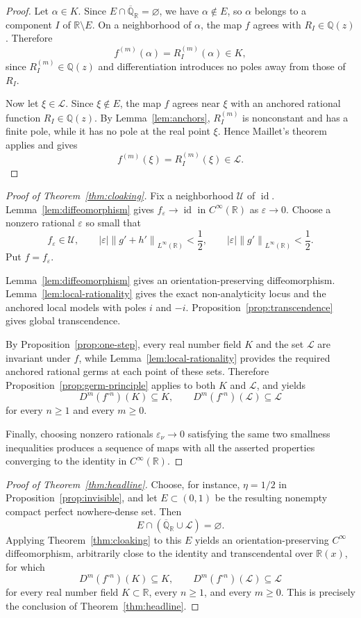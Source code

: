 \documentclass[11pt,reqno]{amsart}
\numberwithin{equation}{section}
\theoremstyle{definition}
\theoremstyle{remark}
\newcommand{\R}{\mathbb R}
\newcommand{\Q}{\mathbb Q}
\newcommand{\Ralg}{\overline{\mathbb Q}_{\mathbb R}}
\newcommand{\Lio}{\mathscr L}
\newcommand{\id}{\operatorname{id}}
\newcommand{\norm}[1]{\left\lVert #1\right\rVert}
\begin{document}
\begin{proof}
Let $\alpha\in K$. Since $E\cap\Ralg=\varnothing$, we have $\alpha\notin E$, so
$\alpha$ belongs to a component $I$ of $\R\setminus E$. On a neighborhood of
$\alpha$, the map $f$ agrees with $R_I\in\Q(z)$. Therefore
\[
f^{(m)}(\alpha)=R_I^{(m)}(\alpha)\in K,
\]
since $R_I^{(m)}\in\Q(z)$ and differentiation introduces no poles away
from those of $R_I$.

Now let $\xi\in\Lio$. Since $\xi\notin E$, the map $f$ agrees near $\xi$ with
an anchored rational function $R_I\in\Q(z)$. By Lemma~\ref{lem:anchors},
$R_I^{(m)}$ is nonconstant and has a finite pole, while it has no pole at
the real point $\xi$. Hence Maillet's theorem applies and gives
\[
f^{(m)}(\xi)=R_I^{(m)}(\xi)\in\Lio.
\]
\end{proof}

\begin{proof}[Proof of Theorem~\ref{thm:cloaking}]
Fix a neighborhood $\mathcal U$ of $\id$. Lemma~\ref{lem:diffeomorphism} gives $f_\varepsilon\to\id$ in $C^\infty(\R)$ as $\varepsilon\to0$. Choose a nonzero rational $\varepsilon$ so small that
\[
f_\varepsilon\in\mathcal U,
\qquad
|\varepsilon|\norm{g'+h'}_{L^\infty(\R)}<\frac12,
\qquad
|\varepsilon|\norm{g'}_{L^\infty(\R)}<\frac12.
\]
Put $f=f_\varepsilon$.

Lemma~\ref{lem:diffeomorphism} gives an orientation-preserving diffeomorphism. Lemma~\ref{lem:local-rationality} gives the exact non-analyticity locus and the anchored local models with poles $i$ and $-i$. Proposition~\ref{prop:transcendence} gives global transcendence.

By Proposition~\ref{prop:one-step}, every real number field $K$ and the set
$\Lio$ are invariant under $f$, while Lemma~\ref{lem:local-rationality}
provides the required anchored rational germs at each point of these sets.
Therefore Proposition~\ref{prop:germ-principle} applies to both $K$ and
$\Lio$, and yields
\[
D^m(f^{\circ n})(K)\subseteq K,
\qquad
D^m(f^{\circ n})(\Lio)\subseteq\Lio
\]
for every $n\geq1$ and every $m\geq0$.

Finally, choosing nonzero rationals $\varepsilon_\nu\to0$ satisfying the same two smallness inequalities produces a sequence of maps with all the asserted properties converging to the identity in $C^\infty(\R)$.
\end{proof}

\begin{proof}[Proof of Theorem~\ref{thm:headline}]
Choose, for instance, $\eta=1/2$ in Proposition~\ref{prop:invisible}, and let
$E\subset(0,1)$ be the resulting nonempty compact perfect nowhere-dense set.
Then
\[
E\cap(\Ralg\cup\Lio)=\varnothing.
\]
Applying Theorem~\ref{thm:cloaking} to this $E$ yields an
orientation-preserving $C^\infty$ diffeomorphism, arbitrarily close to the
identity and transcendental over $\R(x)$, for which
\[
D^m(f^{\circ n})(K)\subseteq K,
\qquad
D^m(f^{\circ n})(\Lio)\subseteq\Lio
\]
for every real number field $K\subset\R$, every $n\geq1$, and every $m\geq0$.
This is precisely the conclusion of Theorem~\ref{thm:headline}.
\end{proof}
\end{document}
